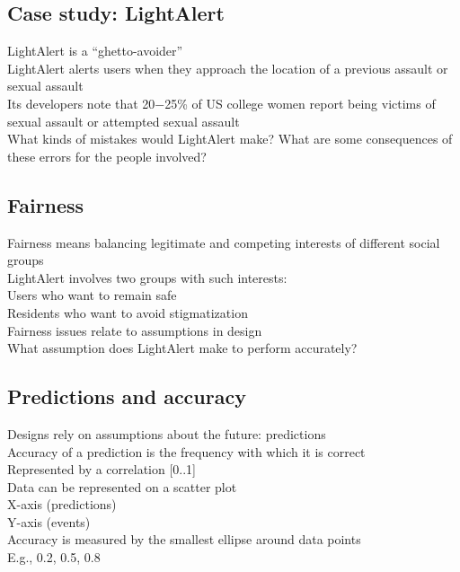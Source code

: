 \documentclass{article}
\begin{document}
\subsection*{Case study: LightAlert}
\label{sub:case_study_lightalert}
LightAlert is a “ghetto-avoider”\\
LightAlert alerts users when they approach the location of a previous assault or sexual assault\\
Its developers note that 20−25\% of US college women report being victims of sexual assault or attempted sexual assault\\
What kinds of mistakes would LightAlert make? What are some consequences of these errors for the people involved?\\
\subsection*{Fairness}
\label{sub:fairness}
Fairness means balancing legitimate and competing interests of different social groups\\
LightAlert involves two groups with such interests:\\
Users who want to remain safe\\
Residents who want to avoid stigmatization\\
Fairness issues relate to assumptions in design\\
What assumption does LightAlert make to perform accurately?\\
\subsection*{Predictions and accuracy}
\label{sub:predictions_and_accuracy}
Designs rely on assumptions about the future: predictions\\
Accuracy of a prediction is the frequency with which it is correct\\
Represented by a correlation [0..1]\\
Data can be represented on a scatter plot\\
X-axis (predictions)\\
Y-axis (events)\\
Accuracy is measured by the smallest ellipse around data points\\
E.g., 0.2, 0.5, 0.8\\
\end{document}
